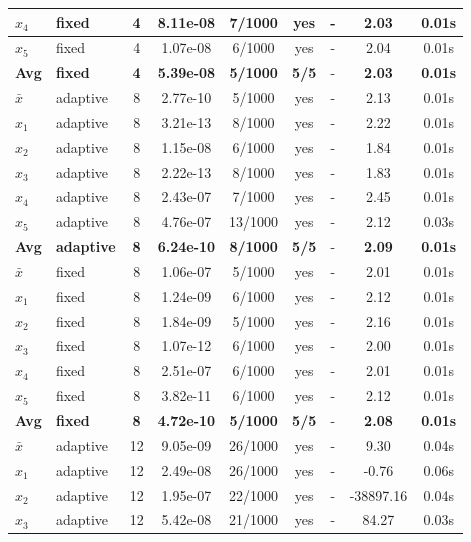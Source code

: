 \begin{longtable}{|l|l|c|c|c|c|c|c|c|}
$x_4$ & fixed & 4 & 8.11e-08 & 7/1000 & yes & - & 2.03 & 0.01s \\
\hline
$x_5$ & fixed & 4 & 1.07e-08 & 6/1000 & yes & - & 2.04 & 0.01s \\
\hline
\hline\hline
\textbf{Avg} & \textbf{fixed} & \textbf{4} & \textbf{5.39e-08} & \textbf{5/1000} & \textbf{5/5} & - & \textbf{2.03} & \textbf{0.01s} \\
\hline\hline
$\bar{x}$ & adaptive & 8 & 2.77e-10 & 5/1000 & yes & - & 2.13 & 0.01s \\
\hline
$x_1$ & adaptive & 8 & 3.21e-13 & 8/1000 & yes & - & 2.22 & 0.01s \\
\hline
$x_2$ & adaptive & 8 & 1.15e-08 & 6/1000 & yes & - & 1.84 & 0.01s \\
\hline
$x_3$ & adaptive & 8 & 2.22e-13 & 8/1000 & yes & - & 1.83 & 0.01s \\
\hline
$x_4$ & adaptive & 8 & 2.43e-07 & 7/1000 & yes & - & 2.45 & 0.01s \\
\hline
$x_5$ & adaptive & 8 & 4.76e-07 & 13/1000 & yes & - & 2.12 & 0.03s \\
\hline
\hline\hline
\textbf{Avg} & \textbf{adaptive} & \textbf{8} & \textbf{6.24e-10} & \textbf{8/1000} & \textbf{5/5} & - & \textbf{2.09} & \textbf{0.01s} \\
\hline\hline
\hline
$\bar{x}$ & fixed & 8 & 1.06e-07 & 5/1000 & yes & - & 2.01 & 0.01s \\
\hline
$x_1$ & fixed & 8 & 1.24e-09 & 6/1000 & yes & - & 2.12 & 0.01s \\
\hline
$x_2$ & fixed & 8 & 1.84e-09 & 5/1000 & yes & - & 2.16 & 0.01s \\
\hline
$x_3$ & fixed & 8 & 1.07e-12 & 6/1000 & yes & - & 2.00 & 0.01s \\
\hline
$x_4$ & fixed & 8 & 2.51e-07 & 6/1000 & yes & - & 2.01 & 0.01s \\
\hline
$x_5$ & fixed & 8 & 3.82e-11 & 6/1000 & yes & - & 2.12 & 0.01s \\
\hline
\hline\hline
\textbf{Avg} & \textbf{fixed} & \textbf{8} & \textbf{4.72e-10} & \textbf{5/1000} & \textbf{5/5} & - & \textbf{2.08} & \textbf{0.01s} \\
\hline\hline
$\bar{x}$ & adaptive & 12 & 9.05e-09 & 26/1000 & yes & - & 9.30 & 0.04s \\
\hline
$x_1$ & adaptive & 12 & 2.49e-08 & 26/1000 & yes & - & -0.76 & 0.06s \\
\hline
$x_2$ & adaptive & 12 & 1.95e-07 & 22/1000 & yes & - & -38897.16 & 0.04s \\
\hline
$x_3$ & adaptive & 12 & 5.42e-08 & 21/1000 & yes & - & 84.27 & 0.03s \\

\end{longtable}
